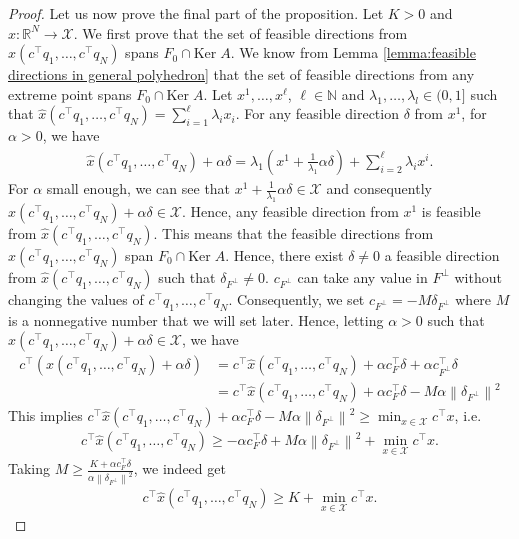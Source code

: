 \documentclass[11pt]{article}
\theoremstyle{plain}
\theoremstyle{definition}
\newcommand{\R}[0]{\mathbb R}
\newcommand{\Ker}[0]{\mathrm{Ker}\;}
\newcommand{\norm}[1]{\left\lVert#1\right\rVert}
\newcommand{\cX}{\mathcal{X}}
\begin{document}
\begin{proof}
Let us now prove the final part of the proposition. Let $K>0$ and $\hat{x}:\R^N \longrightarrow \cX$. We first prove that the set of feasible directions from $\hat{x}\left(c^\top q_1,\dots,c^\top q_N\right)$ spans $F_0\cap \Ker A$. We know from Lemma \ref{lemma:feasible directions in general polyhedron} that the set of feasible directions from any extreme point spans $F_0\cap \Ker A $. Let $x^1,\dots,x^\ell$, $\ell\in \mathbb N$ and $\lambda_1,\dots,\lambda_l\in (0,1]$ such that $\hat{x}\left(c^\top q_1,\dots,c^\top q_N\right)=\sum_{i=1}^{\ell}\lambda_i x_i$. For any feasible direction $\delta$ from $x^1$, for $\alpha>0$, we have 
\begin{align*}
    \hat{x}\left(c^\top q_1,\dots,c^\top q_N\right) +\alpha \delta = \lambda_1(x^1 + \frac{1}{\lambda_1}\alpha \delta) + \sum_{i=2}^{\ell}\lambda_ix^i.
\end{align*}
For $\alpha$ small enough, we can see that $x^1 + \frac{1}{\lambda_1}\alpha \delta\in \cX$ and consequently $\hat{x}\left(c^\top q_1,\dots,c^\top q_N\right) +\alpha \delta\in \cX$. Hence, any feasible direction from $x^1$ is feasible from $\hat{x}\left(c^\top q_1,\dots,c^\top q_N\right)$. This means that the feasible directions from $\hat{x}\left(c^\top q_1,\dots,c^\top q_N\right)$ span $F_0\cap \Ker A$. Hence, there exist $\delta\neq 0$ a feasible direction from $\hat{x}\left(c^\top q_1,\dots,c^\top q_N\right)$ such that $\delta_{F^\perp}\neq 0$. $c_{F^\perp }$ can take any value in $ F^\perp $ without changing the values of $c^\top q_1,\dots, c^\top q_N$. Consequently, we set $c_{ F^\perp }=-M\delta_{F^\perp }$ where $M$ is a nonnegative number that we will set later. Hence, letting $\alpha >0$ such that $\hat{x}\left(c^\top q_1,\dots,c^\top q_N\right)+\alpha \delta \in \cX$, we have 
\begin{align*}
    c^\top (\hat{x}\left(c^\top q_1,\dots,c^\top q_N\right)+\alpha \delta)&=c^\top \hat{x}\left(c^\top q_1,\dots,c^\top q_N\right) + \alpha c_F^\top \delta + \alpha c_{ F^\perp }^\top  \delta\\
    &=c^\top \hat{x}\left(c^\top q_1,\dots,c^\top q_N\right) + \alpha c_F^\top \delta  - M \alpha \norm{\delta_{ F^\perp }}^2
\end{align*}
This implies $c^\top \hat{x}\left(c^\top q_1,\dots,c^\top q_N\right) + \alpha c_F^\top \delta  - M \alpha \norm{\delta_{ F^\perp }}^2 \geq \min_{x\in \cX}c^\top x$, i.e. 
\begin{align*}
    c^\top \hat{x}\left(c^\top q_1,\dots,c^\top q_N\right) \geq - \alpha c_F^\top \delta  + M \alpha \norm{\delta_{F^\perp }}^2 +\min_{x\in \cX}c^\top x.
\end{align*}
Taking $M\geq \frac{K +\alpha c_F^\top \delta }{\alpha \norm{\delta_{ F^\perp }}^2 }$, we indeed get 
\begin{align*}
    c^\top \hat{x}\left(c^\top q_1,\dots,c^\top q_N\right) \geq K +\min_{x\in \cX}c^\top x.
\end{align*}
 \end{proof}
\end{document}
